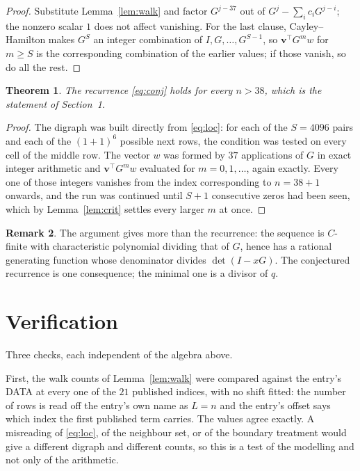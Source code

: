 \documentclass[11pt,a4paper]{article}
\theoremstyle{plain}
\newtheorem{theorem}{Theorem}
\theoremstyle{definition}
\newtheorem{remark}[theorem]{Remark}
\begin{document}
\begin{proof}
Substitute Lemma~\ref{lem:walk} and factor $G^{j-37}$ out of
$G^{j}-\sum_ic_iG^{j-i}$; the nonzero scalar $1$ does not affect
vanishing. For the last clause, Cayley--Hamilton makes $G^{S}$ an integer combination of
$I,G,\dots,G^{S-1}$, so $\mathbf{v}^{\!\top}G^{m}w$ for $m\ge S$ is the corresponding
combination of the earlier values; if those vanish, so do all the rest.
\end{proof}

\begin{theorem}
The recurrence \eqref{eq:conj} holds for every $n>38$, which is the statement of
Section~1.
\end{theorem}

\begin{proof}
The digraph was built directly from \eqref{eq:loc}: for each of the $S=4096$ pairs and each
of the $(1+1)^{6}$ possible next rows, the condition was tested on every cell of
the middle row. The vector $w$ was formed by $37$ applications of $G$ in exact integer
arithmetic and $\mathbf{v}^{\!\top}G^{m}w$ evaluated for $m=0,1,\dots$, again exactly.
Every one of those integers vanishes from the index corresponding to $n=38+1$ onwards,
and the run was continued until $S+1$ consecutive zeros had been seen, which by
Lemma~\ref{lem:crit} settles every larger $m$ at once.
\end{proof}

\begin{remark}
The argument gives more than the recurrence: the sequence is $C$-finite with characteristic
polynomial dividing that of $G$, hence has a rational generating function whose denominator
divides $\det(I-xG)$. The conjectured recurrence is one consequence; the minimal one is a
divisor of $q$.
\end{remark}

\section{Verification}

Three checks, each independent of the algebra above.

First, the walk counts of Lemma~\ref{lem:walk} were compared against the entry's DATA at
every one of the $21$ published indices, with no shift fitted: the number of rows is
read off the entry's own name as $L=n$ and the entry's offset says which index the first
published term carries. The values agree exactly. A misreading of \eqref{eq:loc}, of the
neighbour set, or of the boundary treatment would give a different digraph and different
counts, so this is a test of the modelling and not only of the arithmetic.
\end{document}
